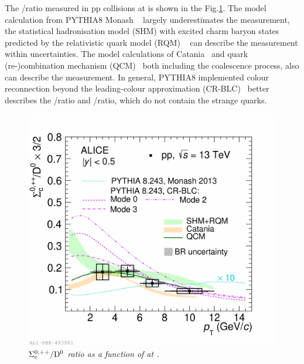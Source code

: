 The \Sc/\Do ratio measured in pp collisions at \tevt is shown in the Fig.\ref{ScFig}.
The model calculation from PYTHIA8 Monash ~\cite{Skands:2014pea} largely underestimates the measurement, the statistical hadronisation model (SHM) with excited charm baryon states predicted by the relativistic quark model (RQM) ~\cite{Andronic:2009sv} can describe the measurement within uncertainties.
The model calculations of Catania~\cite{MINISSALE2021136622} and quark (re-)combination mechanism (QCM)~\cite{Song:2018tpv} both including the coalescence process, also can describe the measurement. In general, PYTHIA8 implemented colour reconnection beyond the leading-colour approximation (CR-BLC)~\cite{Christiansen:2015yqa} better describes the \Lc/\Do ratio and \Sc/\Do ratio, which do not contain the strange quarks.
\begin{figure}[ht!]
    \centering
    \includegraphics[width=0.85 \textwidth]{fig/plot_scd0.pdf}
    \caption{\it $\rm \Sigma_c^{0,++}/D^{0}$ ratio as a function of \pt at \tevt.}
    \label{ScFig}
\end{figure}



